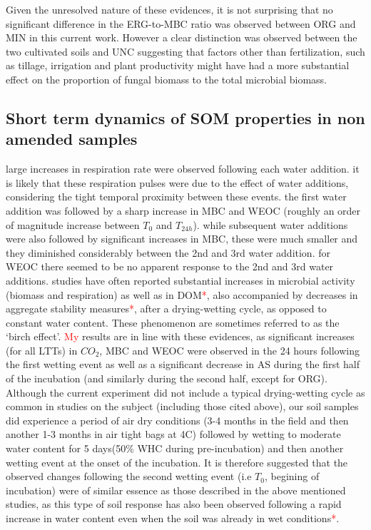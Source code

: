 \documentclass[12pt]{report}
\newcommand{\myRed}[1]{\textcolor{red}{#1}} %
\begin{document}
			Given the unresolved nature of these evidences, it is not surprising that no significant difference in the ERG-to-MBC ratio was observed between ORG and MIN in this current work. However a clear distinction was observed between the two cultivated soils and UNC suggesting that factors other than fertilization, such as tillage, irrigation and plant productivity might have had a more substantial effect on the proportion of fungal biomass to the total microbial biomass. 
			
	\subsection{Short term dynamics of SOM properties in non amended samples}\hypertarget{subsection_4.2.2}{}

		large increases in respiration rate were observed following each water addition. it is likely that these respiration pulses were due to the effect of water additions, considering the tight temporal proximity between these events. the first water addition was followed by a sharp increase in MBC and WEOC (roughly an order of magnitude increase between $ T_0 $ and $ T_{24h} $). while subsequent water additions were also followed by significant increases in MBC, these were much smaller and they diminished considerably between the 2nd and 3rd water addition. for WEOC there seemed to be no apparent response to the 2nd and 3rd water additions. 
		studies have often reported substantial increases in microbial activity (biomass and respiration) as well as in DOM\myRed{*}, also accompanied by decreases in aggregate stability measures\myRed{*}, after a drying-wetting cycle, as opposed to constant water content. These phenomenon are sometimes referred to as the ‘birch effect’.  \myRed{My} results are in line with these evidences, as significant increases (for all LTTs) in  $CO_2 $, MBC and WEOC  were observed in the 24 hours following the first wetting event as well as a significant decrease in AS during the first half of the incubation (and similarly during the second half, except for ORG). Although the current experiment did not include a typical drying-wetting cycle as common in  studies on the subject (including those cited above), our soil samples did experience a period of air dry conditions (3-4 months in the field  and then another 1-3 months in air tight bags at 4C) followed by wetting to moderate water content for 5 days(50\% WHC during pre-incubation) and then another wetting event at the onset of the incubation. It is therefore suggested that the observed changes following the second wetting event (i.e $ T_0$, begining of incubation) were of similar essence as those described in the above mentioned studies, as this type of soil response has also been observed following a rapid increase in water content even when the soil was already in wet conditions\myRed{*}. 
\end{document}
